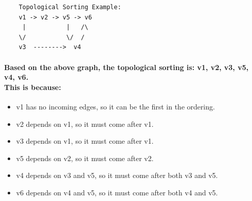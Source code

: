 \documentclass{article}
\begin{document}
\begin{verbatim}
    Topological Sorting Example:
    v1 -> v2 -> v5 -> v6
     |           |   /\
    \/           \/  /
    v3  -------->  v4  
\end{verbatim}

\paragraph{
    Based on the above graph, the topological sorting is: v1, v2, v3, v5, v4, v6.\\
    This is because:}
    
\begin{itemize}
    \item v1 has no incoming edges, so it can be the first in the ordering.
    \item v2 depends on v1, so it must come after v1.
    \item v3 depends on v1, so it must come after v1.
    \item v5 depends on v2, so it must come after v2.
    \item v4 depends on v3 and v5, so it must come after both v3 and v5.
    \item v6 depends on v4 and v5, so it must come after both v4 and v5.
\end{itemize}
\end{document}
